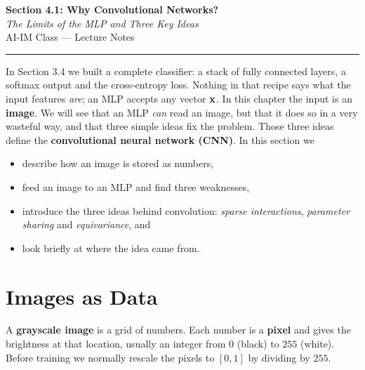 \documentclass[12pt, a4paper]{article}
\begin{document}
\begin{center}
  {\LARGE \textbf{Section 4.1: Why Convolutional Networks?}} \\[0.3em]
  {\large\itshape The Limits of the MLP and Three Key Ideas} \\[0.5em]
  {\large AI-IM Class --- Lecture Notes}%
  \ifstudentmode
  \fi
\end{center}

\vspace{1em}
\hrule
\vspace{1.5em}

In Section 3.4 we built a complete classifier: a stack of fully connected
layers, a softmax output and the cross-entropy loss. Nothing in that recipe
says what the input features \emph{are}; an MLP accepts any vector $\mathbf{x}$.
In this chapter the input is an \textbf{image}. We will see that an MLP
\emph{can} read an image, but that it does so in a very wasteful way, and
that three simple ideas fix the problem. Those three ideas define the
\textbf{convolutional neural network (CNN)}. In this section we
\begin{itemize}[nosep]
  \item describe how an image is stored as numbers,
  \item feed an image to an MLP and find three weaknesses,
  \item introduce the three ideas behind convolution: \emph{sparse
          interactions}, \emph{parameter sharing} and \emph{equivariance},
        and
  \item look briefly at where the idea came from.
\end{itemize}

\section{Images as Data}

A \textbf{grayscale image} is a grid of numbers. Each number is a
\textbf{pixel} and gives the brightness at that location, usually an integer
from $0$ (black) to $255$ (white). Before training we normally rescale the
pixels to $[0, 1]$ by dividing by $255$.
\end{document}

